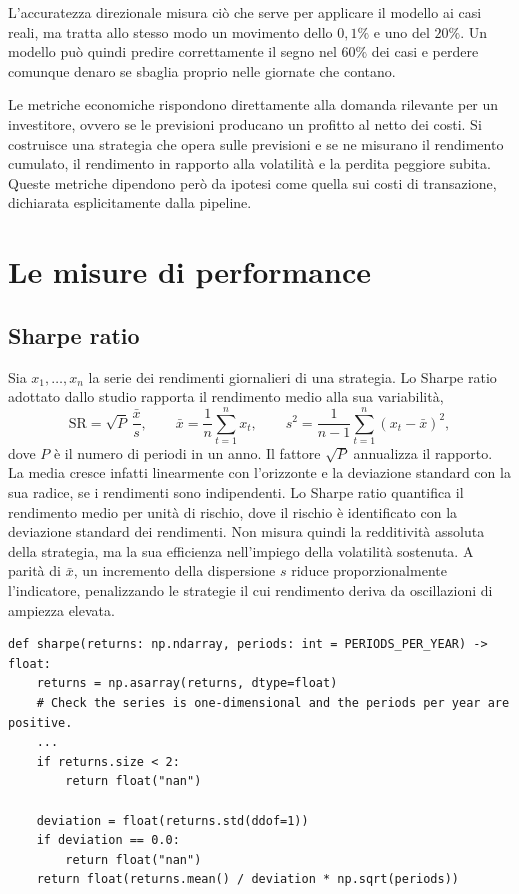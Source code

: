 L'accuratezza direzionale misura ciò che serve per applicare il modello ai casi reali, ma tratta allo stesso modo un movimento dello $0{,}1\%$ e uno del $20\%$. Un modello può quindi predire correttamente il segno nel $60\%$ dei casi e perdere comunque denaro se sbaglia proprio nelle giornate che contano.

Le metriche economiche rispondono direttamente alla domanda rilevante per un investitore, ovvero se le previsioni producano un profitto al netto dei costi. Si costruisce una strategia che opera sulle previsioni e se ne misurano il rendimento cumulato, il rendimento in rapporto alla volatilità e la perdita peggiore subita. Queste metriche dipendono però da ipotesi come quella sui costi di transazione, dichiarata esplicitamente dalla pipeline.

\section{Le misure di performance}
\label{sec:bt-metrics}

\subsection{Sharpe ratio}
\label{sec:bt-sharpe}

Sia $x_1,\dots,x_n$ la serie dei rendimenti giornalieri di una strategia. Lo Sharpe ratio~\cite{sharpe1966mutual,sharpe1994sharpe} adottato dallo studio rapporta il rendimento medio alla sua variabilità,
\begin{equation}
\label{eq:bt-sharpe}
\mathrm{SR}=\sqrt{P}\,\frac{\bar x}{s},\qquad \bar x=\frac1n\sum_{t=1}^n x_t,\qquad s^2=\frac{1}{n-1}\sum_{t=1}^n(x_t-\bar x)^2,
\end{equation}
dove $P$ è il numero di periodi in un anno. Il fattore $\sqrt{P}$ annualizza il rapporto. La media cresce infatti linearmente con l'orizzonte e la deviazione standard con la sua radice, se i rendimenti sono indipendenti. Lo Sharpe ratio quantifica il rendimento medio per unità di rischio, dove il rischio è identificato con la deviazione standard dei rendimenti. Non misura quindi la redditività assoluta della strategia, ma la sua efficienza nell'impiego della volatilità sostenuta. A parità di $\bar x$, un incremento della dispersione $s$ riduce proporzionalmente l'indicatore, penalizzando le strategie il cui rendimento deriva da oscillazioni di ampiezza elevata.

\begin{listing}[H]
\begin{verbatim}
def sharpe(returns: np.ndarray, periods: int = PERIODS_PER_YEAR) -> float:
    returns = np.asarray(returns, dtype=float)
    # Check the series is one-dimensional and the periods per year are positive.
    ...
    if returns.size < 2:
        return float("nan")

    deviation = float(returns.std(ddof=1))
    if deviation == 0.0:
        return float("nan")
    return float(returns.mean() / deviation * np.sqrt(periods))
\end{verbatim}
\caption{\texttt{sharpe}}
\label{lst:sharpe}
\end{listing}

